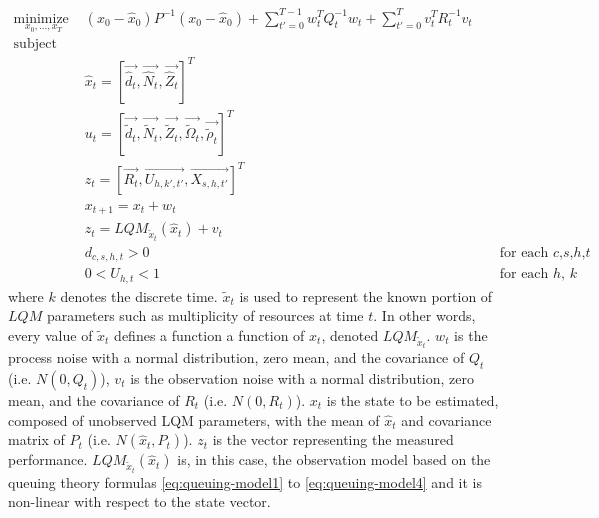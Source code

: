\begin{align*} 
 \underset{x_0,...,x_T}{\text{minimize }}  
   &  (x_0-\hat{x}_0)P^{-1}(x_0-\hat{x}_0)
 	 + \sum_{t'=0}^{T-1} w^T_t Q^{-1}_t w_t 
	 + \sum_{t'=0}^{T}  v^T_t R^{-1}_t v_t \nonumber  \\ 
    \text{subject to:} \nonumber \\   
    & \hat{x}_t=[\overrightarrow{\hat{d}_t},\overrightarrow{\hat{N}_t},\overrightarrow{\hat{Z}_t}]^T  \nonumber \\  
    & u_t=[\overrightarrow{\tilde{d}_t},\overrightarrow{\tilde{N}_t},\overrightarrow{\tilde{Z}_t},\overrightarrow{\tilde{\Omega}_t}, \overrightarrow{\tilde{\rho}_t}]^T  \nonumber \\   
    & z_t=[\overrightarrow{R_t},\overrightarrow{U_{h,k',t'}},\overrightarrow{X_{s,h,t'}}]^T  \nonumber \\   
    & x_{t + 1} = x_t+w_t \nonumber \\     
    & z_t = LQM_{\tilde{x}_t}(\hat{x}_t)+v_t  \nonumber \\
    &  d_{c,s,h,t}>0  && \text{  for each $c$,$s$,$h$,$t$}  \nonumber \\  
    &  0<U_{h,t}< 1 && \text{ for each $h$, $k$} \nonumber
\end{align*} 
where 
 $k$ denotes the discrete time. 
 $\tilde{x}_t$ is used to represent the known portion of $LQM$ parameters such as multiplicity of resources at time $t$. In other words, every value of $\tilde{x}_t$ defines a function a function of $x_t$, denoted $LQM_{\tilde{x}_t}$. 
 $w_t$ is the process noise with a normal distribution, zero mean, and the covariance of $Q_t$ (i.e. $N(0,Q_t)$),  
 $v_t$ is the observation noise with a normal distribution, zero mean, and the covariance of $R_t$ (i.e. $N(0,R_t)$).  
 $x_t$ is the state to be estimated, composed of unobserved LQM parameters, with the mean of $\hat{x}_t$ and covariance matrix of $P_t$ (i.e. $N(\hat{x}_t,P_t)$).
 $z_t$ is the vector representing the measured performance.  
 $LQM_{\tilde{x}_t}(\hat{x}_t)$ is, in this case, the observation model based on the queuing theory formulas \ref{eq:queuing-model1} to \ref{eq:queuing-model4} and it is non-linear with respect to the state vector.   

